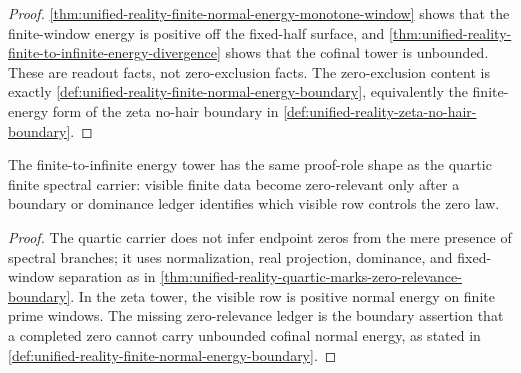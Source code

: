 \begin{proof}
\autoref{thm:unified-reality-finite-normal-energy-monotone-window}
shows that the finite-window energy is positive off the fixed-half
surface, and
\autoref{thm:unified-reality-finite-to-infinite-energy-divergence}
shows that the cofinal tower is unbounded.  These are readout facts, not
zero-exclusion facts.  The zero-exclusion content is exactly
\autoref{def:unified-reality-finite-normal-energy-boundary}, equivalently
the finite-energy form of the zeta no-hair boundary in
\autoref{def:unified-reality-zeta-no-hair-boundary}.
\end{proof}

\begin{corollary}
\label{cor:unified-reality-finite-models-mark-zero-relevance-gap}
The finite-to-infinite energy tower has the same proof-role shape as the
quartic finite spectral carrier: visible finite data become zero-relevant
only after a boundary or dominance ledger identifies which visible row
controls the zero law.
\end{corollary}

\begin{proof}
The quartic carrier does not infer endpoint zeros from the mere presence
of spectral branches; it uses normalization, real projection, dominance,
and fixed-window separation as in
\autoref{thm:unified-reality-quartic-marks-zero-relevance-boundary}.  In
the zeta tower, the visible row is positive normal energy on finite prime
windows.  The missing zero-relevance ledger is the boundary assertion
that a completed zero cannot carry unbounded cofinal normal energy, as
stated in
\autoref{def:unified-reality-finite-normal-energy-boundary}.
\end{proof}

